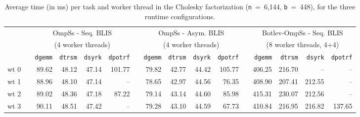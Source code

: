 \begin{table}%
\centering
\caption{Average time (in ms) per task and worker thread in the Cholesky factorization  ({\tt n}~=~6,144, 
{\tt b}~=~448), for the three runtime configurations.}
\label{tab:2dp_tasks}

\ca{2pt}

\renewcommand{\fg}[1]{{#1}} 
\renewcommand{\br}[1]{{#1}} 

{\scriptsize
\begin{tabular}{crrrrrrrrrrrrrrr} 
   	\toprule
                 & \phantom{a} & \multicolumn{4}{c}{OmpSs - Seq. BLIS} & \phantom{ab} & \multicolumn{4}{c}{OmpSs - Asym. BLIS} & \phantom{ab} & \multicolumn{4}{c}{Botlev-OmpSs - Seq. BLIS} \\ 
                 & \phantom{a} & \multicolumn{4}{c}{(4 worker threads)} & \phantom{ab} & \multicolumn{4}{c}{(4 worker threads)} & \phantom{ab} & \multicolumn{4}{c}{(8 worker threads, 4+4)} \\ 
                                          \cmidrule{3-6}                                         \cmidrule{8-11}                                      \cmidrule{13-16}
                       & \phantom{a} &    {\tt dgemm} & {\tt dtrsm}& {\tt dsyrk}& {\tt dpotrf}  & \phantom{ab} & {\tt dgemm}  & {\tt dtrsm} & {\tt dsyrk} & {\tt dpotrf}& \phantom{ab} & {\tt dgemm} & {\tt dtrsm} & {\tt dsyrk} & {\tt dpotrf}         \\ \hline 
	 {\sc wt 0}    & \phantom{a} &    \br{89.62} & \fg{48.12} & \fg{47.14} & \fg{101.77}    & \phantom{ab} & \fg{79.82}  & \fg{42.77}  & \fg{44.42}  & \fg{105.77}  & \phantom{ab} & \fg{406.25} & \fg{216.70} & \fg{--} & \fg{--}    \\ \cline{3-16}
	 {\sc wt 1}    & \phantom{a} &    \br{88.96} & \br{48.10} & \fg{47.14} & \fg{--}      & \phantom{ab} & \fg{78.65}  & \fg{42.97}  & \fg{44.56}  & \fg{76.35}  & \phantom{ab} & \fg{408.90} & \fg{207.41} & \fg{212.55} & \fg{--}    \\ \cline{3-16}
	 {\sc wt 2}    & \phantom{a} &    \br{89.02} & \br{48.36} & \br{47.18} & \fg{87.22}    & \phantom{ab} & \fg{79.14}  & \fg{43.14}  & \fg{44.60}  & \fg{85.98}  & \phantom{ab} & \fg{415.31} & \fg{230.07} & \fg{212.56} & \fg{--}    \\ \cline{3-16}
	 {\sc wt 3}    & \phantom{a} &    \br{90.11} & \br{48.51} & \br{47.42} & \fg{--}      & \phantom{ab} & \fg{79.28}  & \fg{43.10}  & \fg{44.59}  & \fg{67.73}  & \phantom{ab} & \fg{410.84} & \fg{216.95} & \fg{216.82} & \fg{137.65}    \\ \cline{3-16}

\end{tabular}}
\end{table}
